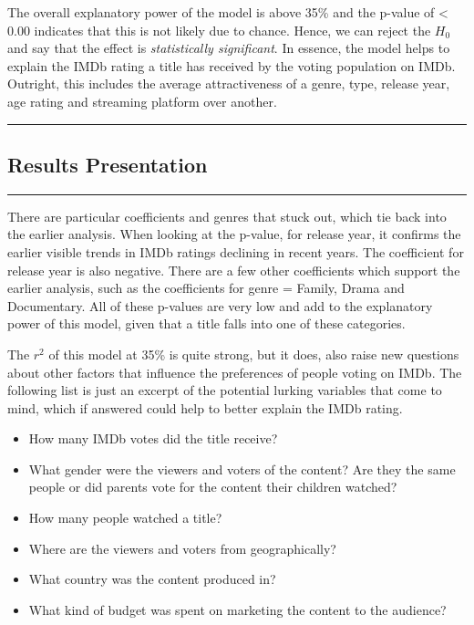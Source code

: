 \documentclass[
]{article}
\providecommand{\tightlist}{%
  \setlength{\itemsep}{0pt}\setlength{\parskip}{0pt}}
\begin{document}
The overall explanatory power of the model is above 35\% and the p-value
of \textless{} 0.00 indicates that this is not likely due to chance.
Hence, we can reject the \(H_0\) and say that the effect is
\emph{statistically significant}. In essence, the model helps to explain
the IMDb rating a title has received by the voting population on IMDb.
Outright, this includes the average attractiveness of a genre, type,
release year, age rating and streaming platform over another.

\begin{center}\rule{0.5\linewidth}{0.5pt}\end{center}

\hypertarget{results-presentation}{%
\subsection{Results Presentation}\label{results-presentation}}

\begin{center}\rule{0.5\linewidth}{0.5pt}\end{center}

There are particular coefficients and genres that stuck out, which tie
back into the earlier analysis. When looking at the p-value, for release
year, it confirms the earlier visible trends in IMDb ratings declining
in recent years. The coefficient for release year is also negative.
There are a few other coefficients which support the earlier analysis,
such as the coefficients for genre = Family, Drama and Documentary. All
of these p-values are very low and add to the explanatory power of this
model, given that a title falls into one of these categories.

The \(r^2\) of this model at 35\% is quite strong, but it does, also
raise new questions about other factors that influence the preferences
of people voting on IMDb. The following list is just an excerpt of the
potential lurking variables that come to mind, which if answered could
help to better explain the IMDb rating.

\begin{itemize}
\tightlist
\item
  How many IMDb votes did the title receive?
\item
  What gender were the viewers and voters of the content? Are they the
  same people or did parents vote for the content their children
  watched?
\item
  How many people watched a title?
\item
  Where are the viewers and voters from geographically?
\item
  What country was the content produced in?
\item
  What kind of budget was spent on marketing the content to the
  audience?
\end{itemize}
\end{document}
